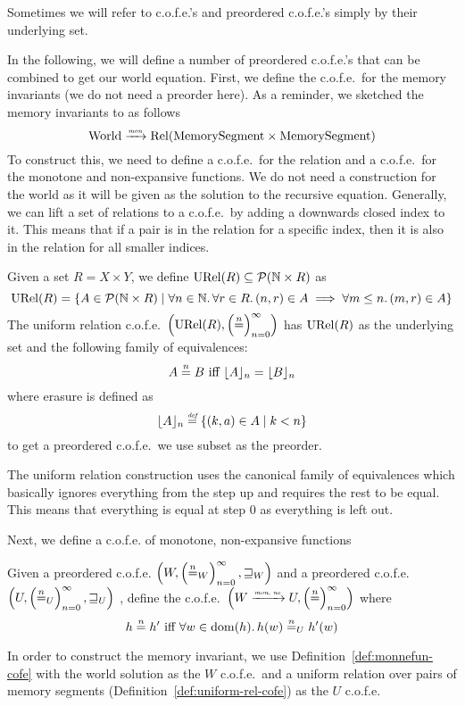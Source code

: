 \begin{jversion}
Sometimes we will refer to c.o.f.e.'s and preordered c.o.f.e.'s simply by their underlying set.

In the following, we will define a number of preordered c.o.f.e.'s that can be combined to get our world equation.
First, we define the c.o.f.e.\ for the memory invariants (we do not need a preorder here).
As a reminder, we sketched the memory invariants to as follows
\[
  \World \monfun \Rel{\MemSeg \times \MemSeg}
\]
To construct this, we need to define a c.o.f.e.\ for the relation and a c.o.f.e.\ for the monotone and non-expansive functions.
We do not need a construction for the world as it will be given as the solution to the recursive equation.
Generally, we can lift a set of relations to a c.o.f.e.\ by adding a downwards closed index to it.
This means that if a pair is in the relation for a specific index, then it is also in the relation for all smaller indices.
\begin{definition}
  \label{def:uniform-rel-cofe}
  Given a set $R = X \times Y$, we define $\URel{R} \subseteq \powerset{\nats \times R}$ as
  \[
    \URel{R} = \{ A \in \powerset{\nats \times R} \mid \forall n \in \nats \ldotp \forall r \in R \ldotp \npair{r} \in A \implies \forall m \leq n \ldotp \npair[m]{r} \in A\}
  \]
  The uniform relation c.o.f.e.\ $\cofe{\URel{R}}$ has $\URel{R}$ as the underlying set and the following family of equivalences:
  \[
    A \nequal B \text{ iff } \erasen{A}{n} = \erasen{B}{n}
  \]
  where erasure is defined as
  \[
    \erasen{A}{n} \defeq \{(k,a) \in A \mid k < n\}
  \]
  to get a preordered c.o.f.e.\, we use subset as the preorder.
\end{definition}
The uniform relation construction uses the canonical family of equivalences which basically ignores everything from the step up and requires the rest to be equal.
This means that everything is equal at step $0$ as everything is left out.

Next, we define a c.o.f.e. of monotone, non-expansive functions
\begin{definition}
\label{def:monnefun-cofe}
  Given a preordered c.o.f.e. $\left(W,\left(\nequal[n]_W\right)_{n=0}^{\infty},\future_W\right)$ and a preordered c.o.f.e.\ $\left(U,\left(\nequal[n]_U\right)_{n=0}^{\infty},\future_U\right)$ , define the c.o.f.e.\ $\left(W \monnefun U,\left(\nequal[n]\right)_{n=0}^{\infty}\right)$ where 
  \[
    h \nequal h' \text{ iff } \forall w \in \dom(h) \ldotp h(w) \nequal_U h'(w)
  \]
\end{definition}
In order to construct the memory invariant, we use Definition~\ref{def:monnefun-cofe} with the world solution as the $W$ c.o.f.e.\, and a uniform relation over pairs of memory segments (Definition~\ref{def:uniform-rel-cofe}) as the $U$ c.o.f.e.


\end{jversion}

